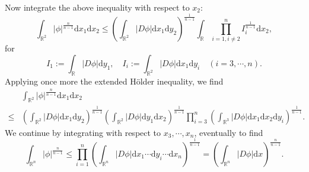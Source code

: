 Now integrate the above inequality with respect to $x_2$:
 \[
   \int_{\mathbb{R}^{2}}\left| \phi \right| ^{\frac{n}{n-1}}\mathrm{d}x_1\mathrm{d}x_2\le \left( \int_{\mathbb{R}^{2}}\left| D\phi \right| \mathrm{d}x_1\mathrm{d}y_2 \right) ^{\frac{1}{n-1}}\int_{\mathbb{R}}\prod_{i=1,i\neq 2}^{n}I_i^{\frac{1}{n-1}}\mathrm{d}x_2, 
\] 
for 
\[
  I_1:=\int_{\mathbb{R}}\left| D\phi \right| \mathrm{d}y_1,\quad I_i:=\int_{\mathbb{R}^{2}}\left| D\phi \right| \mathrm{d}x_1\mathrm{d}y_i\quad \left( i=3,\cdots,n \right) .
\]
Applying once more the extended H\"{o}lder inequality, we find
\begin{align*}
  &\int_{\mathbb{R}^{2}}\left| \phi \right| ^{\frac{n}{n-1}}\mathrm{d}x_1\mathrm{d}x_2 \\
  \le &\left( \int_{\mathbb{R}^{2}}\left| D\phi \right| \mathrm{d}x_1\mathrm{d}y_2 \right) ^{\frac{1}{n-1}}\left( \int_{\mathbb{R}^{2}}\left| D\phi \right| \mathrm{d}y_1\mathrm{d}x_2 \right) ^{\frac{1}{n-1}}\prod_{i=3}^{n}\left( \int_{\mathbb{R}^{3}}\left| D\phi \right| \mathrm{d}x_1\mathrm{d}x_2\mathrm{d}y_i \right)^{\frac{1}{n-1}}. 
\end{align*}
We continue by integrating with respect to $x_3,\cdots,x_n$, eventually to find
\[
  \int_{\mathbb{R}^{n}}\left| \phi \right| ^{\frac{n}{n-1}}\le \prod_{i=1}^{n}\left( \int_{\mathbb{R}^{n}}\left| D\phi \right| \mathrm{d}x_1\cdots\mathrm{d}y_i\cdots\mathrm{d}x_n \right)^{\frac{1}{n-1}}=\left( \int_{\mathbb{R}^{n}}\left| D\phi \right| \mathrm{d}x \right) ^{\frac{n}{n-1}}. 
\] 

